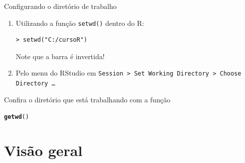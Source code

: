 \documentclass[10pt,handout]{beamer}\usepackage[]{graphicx}\usepackage[]{color}
\makeatletter
\newcommand{\hlstd}[1]{\textcolor[rgb]{0.345,0.345,0.345}{#1}}%
\newcommand{\hlkwd}[1]{\textcolor[rgb]{0.282,0.239,0.545}{\textbf{#1}}}%
\newenvironment{kframe}{%
 \def\at@end@of@kframe{}%
 \ifinner\ifhmode%
  \def\at@end@of@kframe{\end{minipage}}%
  \begin{minipage}{\columnwidth}%
 \fi\fi%
 \def\FrameCommand##1{\hskip\@totalleftmargin \hskip-\fboxsep
 \colorbox{shadecolor}{##1}\hskip-\fboxsep
     \hskip-\linewidth \hskip-\@totalleftmargin \hskip\columnwidth}%
 \MakeFramed {\advance\hsize-\width
   \@totalleftmargin\z@ \linewidth\hsize
   \@setminipage}}%
 {\par\unskip\endMakeFramed%
 \at@end@of@kframe}
\newenvironment{knitrout}{}{} %
\makeatother
\begin{document}
\begin{frame}[fragile]{Configurando o diretório de trabalho}
\begin{enumerate}
\item Utilizando a função \texttt{setwd()} dentro do R:
\begin{verbatim}
> setwd("C:/cursoR")
\end{verbatim}
Note que a barra é invertida!
\item Pelo menu do RStudio em \texttt{Session > Set Working Directory >
  Choose Directory \ldots}
\end{enumerate}
Confira o diretório que está trabalhando com a função
\begin{knitrout}\small
{}\color{fgcolor}\begin{kframe}
\begin{alltt}
\hlkwd{getwd}\hlstd{()}
\end{alltt}
\end{kframe}
\end{knitrout}

\end{frame}

\section{Visão geral}

\end{document}
